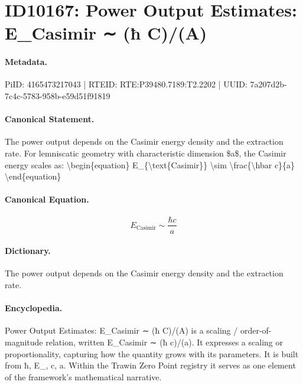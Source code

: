 \section*{ID10167: Power Output Estimates: E\_Casimir ∼ (ħ C)/(A)}
\paragraph{Metadata.}
PiID: 4165473217043 | RTEID: RTE:P39480.7189:T2.2202 | UUID: 7a207d2b-7c4c-5783-958b-e59d51f91819

\paragraph{Canonical Statement.}
The power output depends on the Casimir energy density and the extraction rate. For lemniscatic geometry with characteristic dimension \$a\$, the Casimir energy scales as: \textbackslash{}begin\{equation\} E\_\{\textbackslash{}text\{Casimir\}\} \textbackslash{}sim \textbackslash{}frac\{\textbackslash{}hbar c\}\{a\} \textbackslash{}end\{equation\}

\paragraph{Canonical Equation.}
\[
E_{\text{Casimir}} \sim \frac{\hbar c}{a}
\]

\paragraph{Dictionary.}
The power output depends on the Casimir energy density and the extraction rate.

\paragraph{Encyclopedia.}
Power Output Estimates: E\_Casimir ∼ (ħ C)/(A) is a scaling / order-of-magnitude relation, written E\_Casimir ∼ (ħ c)/(a). It expresses a scaling or proportionality, capturing how the quantity grows with its parameters. It is built from ħ, E\_, c, a. Within the Trawin Zero Point registry it serves as one element of the framework's mathematical narrative.
